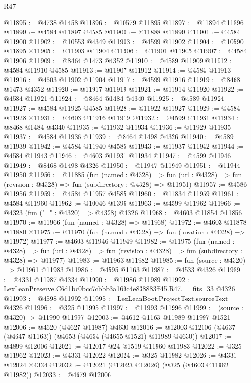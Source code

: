 \begin{lexlean}{R47}
\begin{coremodule}
@11895 := @4738 @1458
@11896 := @10579 @11895
@11897 := @11894 @11896
@11899 := @4584 @11897 @4585
@11900 := @11888 @11899
@11901 := @4584 @11900
@11902 := @10553 @4349
@11903 := @4599 @11902
@11904 := @10590 @11895
@11905 := @11903 @11904
@11906 := @11901 @11905
@11907 := @4584 @11906
@11909 := @8464 @1473 @4352
@11910 := @4589 @11909
@11912 := @4584 @11910 @4585
@11913 := @11907 @11912
@11914 := @4584 @11913
@11916 := @4603 @11902 @11904
@11917 := @4599 @11916
@11919 := @8468 @1473 @4352
@11920 := @11917 @11919
@11921 := @11914 @11920
@11922 := @4584 @11921
@11924 := @8464 @1484 @4340
@11925 := @4589 @11924
@11927 := @4584 @11925 @4585
@11928 := @11922 @11927
@11929 := @4584 @11928
@11931 := @4603 @11916 @11919
@11932 := @4599 @11931
@11934 := @8468 @1484 @4340
@11935 := @11932 @11934
@11936 := @11929 @11935
@11937 := @4584 @11936
@11939 := @8464 @1498 @4326
@11940 := @4589 @11939
@11942 := @4584 @11940 @4585
@11943 := @11937 @11942
@11944 := @4584 @11943
@11946 := @4603 @11931 @11934
@11947 := @4599 @11946
@11949 := @8468 @1498 @4326
@11950 := @11947 @11949
@11951 := @11944 @11950
@11956 := @11885
    (fun (named : @4328) =>
    fun (url : @4328) => fun (revision : @4328) => fun (subdirectory : @4328) => @11951)
@11957 := @4586 @11956
@11959 := @4584 @11957 @4585
@11960 := @11834 @11959
@11961 := @4584 @11960
@11962 := @10046 @1396
@11963 := @4599 @11962
@11966 := @4323 (fun ("_" : @4320) => @4328) @4326
@11968 := @4603 @11854 @11856
@11970 := @11966 (fun (named : @4328) => @11968)
@11972 := @4603 @11878 @11880
@11975 := @11970 (fun (named : @4328) => fun (location : @4328) => @11972)
@11977 := @4603 @11946 @11949
@11982 := @11975
    (fun (named : @4328) =>
    fun (url : @4328) => fun (revision : @4328) => fun (subdirectory : @4328) => @11977)
@11983 := @11963 @11982
@11985 := fun (source : @4320) => @11961 @11983
@11986 := @4595 @1163
@11987 := @4533 @4326
@11989 := @4331 @11987 @4334
@11990 := @11986 @11989
@11992 := LexLeanPreserve.C6d1bc0bcc7cbbb3a169c4e838883ff45.R47.__fits_33 @4326
@11993 := @4598 @11992
@11995 := LexLeanBoot.ProjectText.sourceText @4326
@11996 := @325 @11995
@11997 := @11993 @11996
@11999 := (source : @4320) -> @11990 @11997
@12003 := @4612 @1163 @11989 @11997 @1521
@12006 := @4620 (@4627 @11987) @4630
@12016 := @12003 @12006 (@4637 (@4647 @1163)) (@4653 (@4654 (@4655 @1521) @11989 @4630))
@12017 := @4899 @12006
@12021 := @12017 @24 @1519 @11960 @11983
@12022 := @325 @11962
@12023 := @4331 @12022
@12024 := @325 @11982
@12026 := @4331 @12024 @4334
@12032 := @12021 (@12023 @12026) (@325 (@4603 @11962 @11982))
@12033 := @4679 @12006

\end{coremodule}
\end{lexlean}
